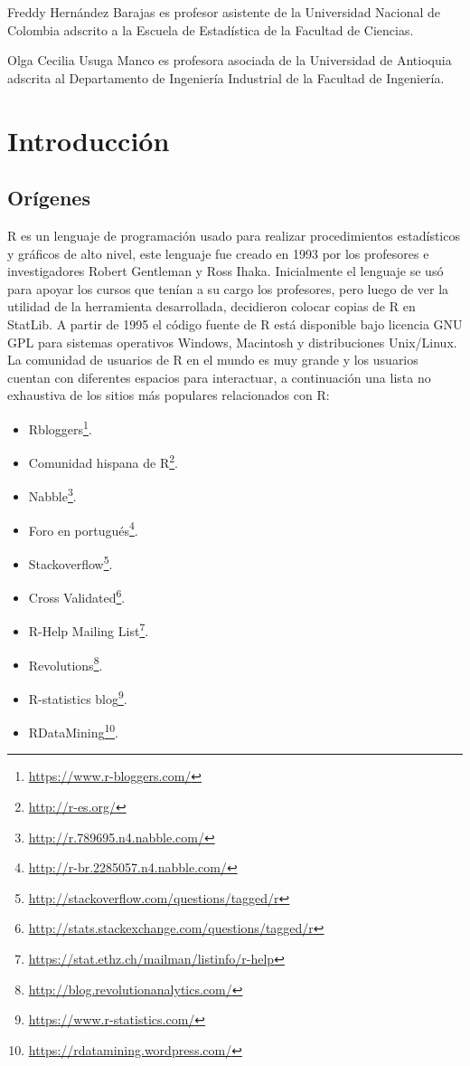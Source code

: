 \documentclass[10pt,]{krantz}
\providecommand{\tightlist}{%
  \setlength{\itemsep}{0pt}\setlength{\parskip}{0pt}}
\renewcommand{\href}[2]{#2\footnote{\url{#1}}}
\begin{document}
Freddy Hernández Barajas es profesor asistente de la Universidad
Nacional de Colombia adscrito a la Escuela de Estadística de la Facultad
de Ciencias.

Olga Cecilia Usuga Manco es profesora asociada de la Universidad de
Antioquia adscrita al Departamento de Ingeniería Industrial de la
Facultad de Ingeniería.

\mainmatter

\chapter{Introducción}\label{intro}

\section{Orígenes} \label{sec:origenes}

R es un lenguaje de programación usado para realizar procedimientos
estadísticos y gráficos de alto nivel, este lenguaje fue creado en 1993
por los profesores e investigadores Robert Gentleman y Ross Ihaka.
Inicialmente el lenguaje se usó para apoyar los cursos que tenían a su
cargo los profesores, pero luego de ver la utilidad de la herramienta
desarrollada, decidieron colocar copias de R en StatLib. A partir de
1995 el código fuente de R está disponible bajo licencia GNU GPL para
sistemas operativos Windows, Macintosh y distribuciones Unix/Linux. La
comunidad de usuarios de R en el mundo es muy grande y los usuarios
cuentan con diferentes espacios para interactuar, a continuación una
lista no exhaustiva de los sitios más populares relacionados con R:

\begin{itemize}
\tightlist
\item
  \href{https://www.r-bloggers.com/}{Rbloggers}.
\item
  \href{http://r-es.org/}{Comunidad hispana de R}.
\item
  \href{http://r.789695.n4.nabble.com/}{Nabble}.
\item
  \href{http://r-br.2285057.n4.nabble.com/}{Foro en portugués}.
\item
  \href{http://stackoverflow.com/questions/tagged/r}{Stackoverflow}.
\item
  \href{http://stats.stackexchange.com/questions/tagged/r}{Cross
  Validated}.
\item
  \href{https://stat.ethz.ch/mailman/listinfo/r-help}{R-Help Mailing
  List}.
\item
  \href{http://blog.revolutionanalytics.com/}{Revolutions}.
\item
  \href{https://www.r-statistics.com/}{R-statistics blog}.
\item
  \href{https://rdatamining.wordpress.com/}{RDataMining}.
\end{itemize}
\end{document}
